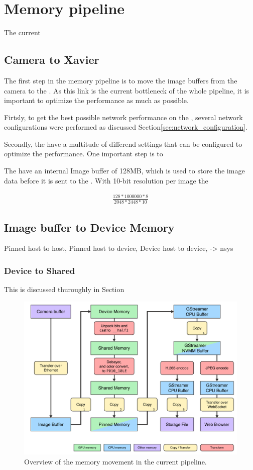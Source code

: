 \section{Memory pipeline}
The current



\subsection{Camera to Xavier}
The first step in the memory pipeline is to move the image buffers from the camera to the \jx.
As this link is the current bottleneck of the whole pipeline, it is important to optimize the performance as much as possible.

Firtsly, to get the best possible network performance on the \jx, several network configurations were performed as discussed Section\ref{sec:network_configuration}.

Secondly, the \cams have a multitude of differend settings that can be configured to optimize the performance.
One important step is to

The \cams have an internal Image buffer of 128MB, which is used to store the image data before it is sent to the \jx.
With 10-bit resolution per image the


\begin{align}
    \frac{128*1000000*8}{2048*2448*10}
\end{align}

\subsection{Image buffer to Device Memory}
Pinned host to host,
Pinned host to device,
Device host to device, -> nsys

\subsubsection{Device to Shared}
This is discussed thuroughly in Section



\begin{figure}[H]
    \centering
    \includegraphics[width=\textwidth]{figures/memory_pipeline/current.pdf}
    \caption{Overview of the memory movement in the current pipeline.}
    \label{fig:pipeline_current}
\end{figure}

